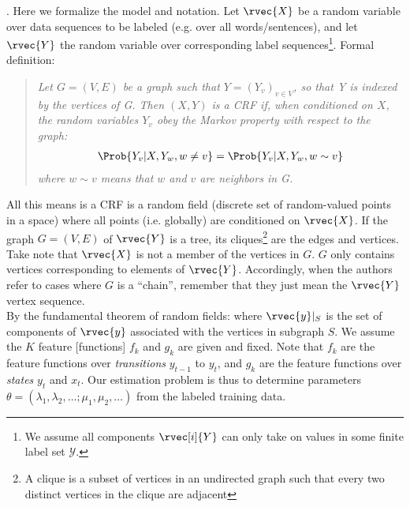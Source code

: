 \documentclass[11pt]{article}
\newcommand\myspace[1][]{\vspace{#1\bigskipamount}}
\newcommand\p{\Needspace{10\baselineskip} \noindent}
\begin{document}
\myspace
\p {}. Here we formalize the model and notation. Let $\rvec{X}$ be a random variable over data sequences to be labeled (e.g. over all words/sentences), and let $\rvec{Y}$ the random variable over corresponding label sequences\footnote{We assume all components $\rvec[i]{Y}$ can only take on values in some finite label set $\mathcal{Y}$.}. Formal definition: 
\vspace{-1em}
\begin{quote}
	{\small \textit{Let $G = (V, E)$ be a graph such that $Y = (Y_v)_{v \in V}$, so that Y is indexed by the vertices of G. Then $(X, Y)$ is a CRF if, when conditioned on $X$, the random variables $Y_v$ obey the Markov property with respect to the graph:
	\begin{align}
	\Prob{Y_v | X, Y_w , w \ne v} =  \Prob{Y_v | X, Y_w , w \sim v}
	\end{align}
	where $w \sim v$ means that $w$ and $v$ are neighbors in G.}}
\end{quote}
All this means is a CRF is a random field (discrete set of random-valued points in a space) where all points (i.e. globally) are conditioned on $\rvec{X}$. If the graph $G = (V, E)$ of $\rvec{Y}$ is a tree, its cliques\footnote{A clique is a subset of vertices in an undirected graph such that every two distinct vertices in the clique are adjacent} are the edges and vertices. Take note that $\rvec{X}$ is not a member of the vertices in $G$. $G$ only contains vertices corresponding to elements of $\rvec{Y}$. Accordingly, when the authors refer to cases where $G$ is a ``chain'', remember that they just mean the $\rvec{Y}$ vertex sequence.  \\

\p By the fundamental theorem of random fields:
where $\rvec{y}|_S$ is the set of components of $\rvec{y}$ associated with the vertices in subgraph $S$. We assume the $K$ feature [functions] $f_k$ and $g_k$ are given and fixed. Note that $f_k$ are the feature functions over \textit{transitions} $y_{t-1}$ to $y_t$, and $g_k$ are the feature functions over \textit{states} $y_t$ and $x_t$. Our estimation problem is thus to determine parameters $\theta = (\lambda_1, \lambda_2, \ldots; \mu_1, \mu_2, \ldots)$ from the labeled training data.
\end{document}
